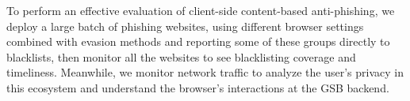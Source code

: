 \documentclass[letterpaper,twocolumn,10pt]{article}
\begin{document}
To perform an effective evaluation of client-side content-based anti-phishing, we deploy a large batch of phishing websites, using different browser settings combined with evasion methods and reporting some of these groups directly to blacklists, then monitor all the websites to see blacklisting coverage and timeliness. Meanwhile, we monitor network traffic to analyze the user's privacy in this ecosystem and understand the browser's interactions at the GSB backend.


\begin{table}
\centering
{}
\caption{Blacklisting evaluation metrics~\cite{oest2020phishtime}}
\label{tab:Blacklisting metrics}
\end{table}
\end{document}
